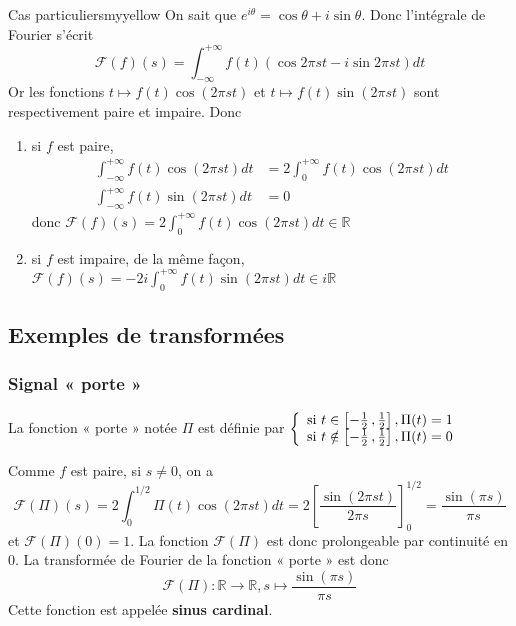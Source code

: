     \begin{omed}{Cas particuliers}{myyellow}
        On sait que $e^{i \theta} = \cos \theta + i \sin \theta$. Donc l’intégrale de Fourier s’écrit 
        \[ \mathcal{F}(f)(s) = \int_{-\infty}^{+\infty} f(t)(\cos 2\pi s t - i \sin 2 \pi s t)dt \]
        Or les fonctions $t \mapsto f(t) \cos (2 \pi s t)$ et $t \mapsto f(t) \sin (2 \pi s t)$ sont respectivement paire et impaire. Donc
        \begin{enumerate}
            \item si $f$ est paire, 
            \begin{align*}
                \int_{-\infty}^{+\infty} f(t) \cos (2 \pi s t) dt &= 2 \int_{0}^{+\infty}
                f(t) \cos( 2 \pi st)dt \\
                \int_{-\infty}^{+\infty} f(t)\sin (2 \pi s t) dt &= 0
            \end{align*} 
            donc $\mathcal{F}(f)(s) = 2 \int_{0}^{+\infty} f(t) \cos(2 \pi s t)dt \in \mathbb{R}$
        \item si $f$ est impaire, de la même façon, $\mathcal{F}(f)(s) = - 2 i \int_{0}^{+\infty} f(t) \sin(2 \pi s t)dt \in i \mathbb{R}$
        \end{enumerate}
    \end{omed}

\subsection{Exemples de transformées}

    \subsubsection{Signal « porte »}

    La fonction « porte » notée $\Pi$ est définie par $\et{\text{si } t \in \intervalleFF{-\frac{1}{2}}{\frac{1}{2}}, \Pi(t) = 1}{\text{si } t \notin \intervalleFF{-\frac{1}{2}}{\frac{1}{2}}, \Pi(t) = 0}$

    Comme $f$ est paire, si $s \neq 0$, on a 
    \[ \mathcal{F}(\Pi)(s) = 2 \int_{0}^{1/2} \Pi(t) \cos(2 \pi s t)dt = 2 \left[\frac{\sin(2 \pi s t)}{2 \pi s}\right]_0^{1/2} = \frac{\sin(\pi s)}{\pi s} \]
    et $\mathcal{F}(\Pi)(0) = 1$. La fonction $\mathcal{F}(\Pi)$ est donc prolongeable par continuité en $0$. La transformée de Fourier de la fonction « porte » est donc 
    \[ \mathcal{F}(\Pi) : \mathbb{R} \rightarrow \mathbb{R}, s \mapsto \frac{\sin(\pi s)}{\pi s} \] 
    Cette fonction est appelée \textbf{sinus cardinal}.

